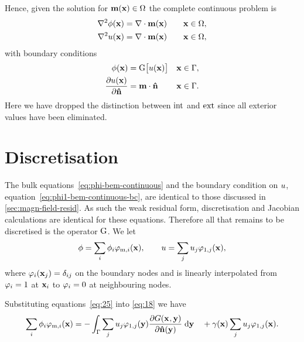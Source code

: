 Hence, given the solution for $\mathbf{m}(\mathbf{x}) \in \Omega$ the complete continuous problem is
 \begin{subequations}
   \label{eq:phi-bem-continuous}
   \begin{align}
     \label{eq:phim-bem-continuous}
     \nabla^2 \phi(\mathbf{x}) &= \nabla \cdot \mathbf{m}(\mathbf{x}) \quad & \mathbf{x} \in \Omega, \\
     \label{eq:phi1-bem-continuous}
     \nabla^2 u(\mathbf{x}) &= \nabla \cdot \mathbf{m}(\mathbf{x})    & \mathbf{x} \in \Omega,
   \end{align}
 \end{subequations}
with boundary conditions
 \begin{subequations}
   \label{eq:phi-bem-continuous-bc}
   \begin{align}
     \label{eq:phim-bem-continuous-bc}
     \phi(\mathbf{x}) &= {\mathbf{\mathrm{G}}} \big[ u(\mathbf{x}) \big]      & \mathbf{x} \in {\Gamma}, \\
     \label{eq:phi1-bem-continuous-bc}
       \frac{\partial u(\mathbf{x})}{\partial \mathbf{\hat{n}}} &= \mathbf{m} \cdot \mathbf{\hat{n}}  & \mathbf{x} \in {\Gamma}.
   \end{align}
 \end{subequations}
Here we have dropped the distinction between $\text{int}$ and $\text{ext}$ since all exterior values have been eliminated.


\section{Discretisation}
\label{sec:discretisation}

The bulk equations~\eqref{eq:phi-bem-continuous} and the boundary condition on $u$, equation~\eqref{eq:phi1-bem-continuous-bc}, are identical to those discussed in \autoref{sec:magn-field-resid}.
As such the weak residual form, discretisation and Jacobian calculations are identical for these equations.
Therefore all that remains to be discretised is the operator ${\mathbf{\mathrm{G}}}$. We let
\begin{equation}
  \phi = \sum_{i} \phi_{{i}} \varphi_{\text{m},{i}}(\mathbf{x}),
  \qquad
  u = \sum_{j} u_{{j}} \varphi_{1,{j}}(\mathbf{x}),
  \label{eq:25}
\end{equation}
where $\varphi_{i}(\mathbf{x}_{j}) = \delta_{{i} {j}}$ on the boundary nodes and is linearly interpolated from $\varphi_{i} = 1$ at $\mathbf{x}_{i}$ to $\varphi_{i} = 0$ at neighbouring nodes.

Substituting equations~\eqref{eq:25} into \eqref{eq:18} we have
\begin{equation*}
  \sum_{i} \phi_{{i}} \varphi_{\text{m},{i}}(\mathbf{x}) =
  - \int_{{\Gamma}} \sum_{j} u_{{j}} \varphi_{1,{j}}(\mathbf{y})
  \frac{\partial G(\mathbf{x}_{},\mathbf{y})}{\partial \mathbf{\hat{n}}(\mathbf{y})} {\; \text{d}} \mathbf{y}
  \quad + \gamma(\mathbf{x}) \sum_{j} u_{{j}} \varphi_{1,{j}}(\mathbf{x}).
\end{equation*}

